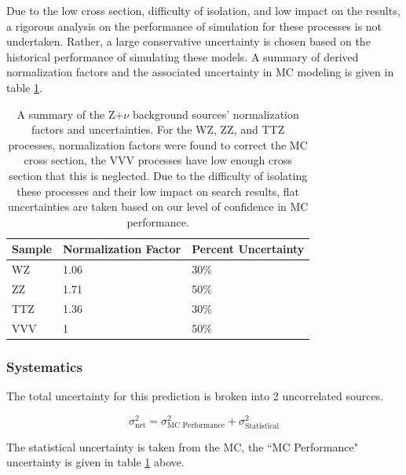       Due to the low cross section, difficulty of isolation, and low impact on the results, a rigorous analysis on the performance of simulation for these processes is not undertaken. Rather, a large conservative uncertainty is chosen based on the historical performance of simulating these models. A summary of derived normalization factors and the associated uncertainty in MC modeling is given in table \ref{tab:znu_norm_factors}.

      \begin{table}[!h]
      \centering
      \caption[A summary of the Z+$\nu$ background sources' normalization factors and uncertainties.]{\label{tab:znu_norm_factors}
      A summary of the Z+$\nu$ background sources' normalization factors and uncertainties. For the WZ, ZZ, and TTZ processes, normalization factors were found to correct the MC cross section, the VVV processes have low enough cross section that this is neglected. Due to the difficulty of isolating these processes and their low impact on search results, flat uncertainties are taken based on our level of confidence in MC performance.
      }
      \begin{center}
        \begin{tabular} {l | l | l}
        \hline
        \hline
        Sample & Normalization Factor & Percent Uncertainty \\
        \hline
        WZ     & 1.06                 & 30\%                \\
        ZZ     & 1.71                 & 50\%                \\
        TTZ    & 1.36                 & 30\%                \\
        VVV    & 1                    & 50\%                \\
        \hline
        \hline
        \end{tabular}
      \end{center}
    \end{table}

  \subsubsection{Systematics}

      The total uncertainty for this prediction is broken into 2 uncorrelated sources.

      \[
        \sigma^2_{\text{net}} = \sigma^2_{\text{MC Performance}} + \sigma^2_{\text{Statistical}}
      \]

      The statistical uncertainty is taken from the MC, the ``MC Performance" uncertainty is given in table \ref{tab:znu_norm_factors} above.

